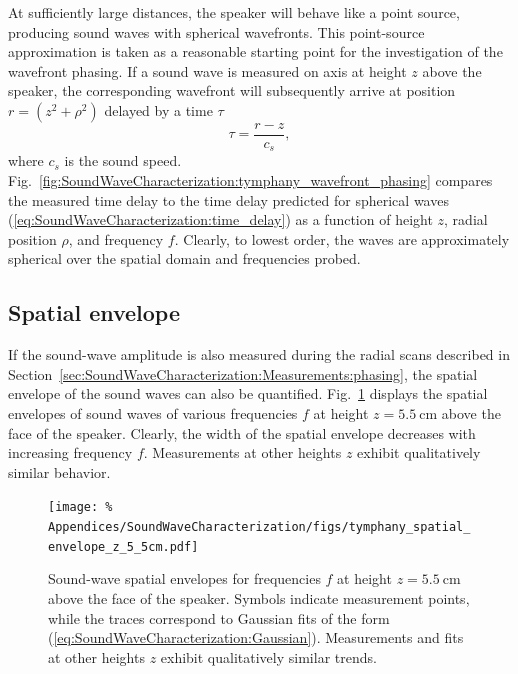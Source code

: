 At sufficiently large distances,
the speaker will behave like a point source,
producing sound waves with spherical wavefronts.
This point-source approximation is taken as a reasonable
starting point for the investigation of the wavefront phasing.
If a sound wave is measured on axis at height $z$ above the speaker,
the corresponding wavefront will subsequently arrive
at position $r = (z^2 + \rho^2)$
delayed by a time $\tau$
\begin{equation}
  \tau = \frac{r - z}{c_s},
  \label{eq:SoundWaveCharacterization:time_delay}
\end{equation}
\graffito{\textcolor{red}{value for $c_s$}}
where $c_s$ is the sound speed.
Fig.~\ref{fig:SoundWaveCharacterization:tymphany_wavefront_phasing}
compares the measured time delay to
the time delay predicted for spherical waves
(\ref{eq:SoundWaveCharacterization:time_delay})
as a function of height $z$, radial position $\rho$, and frequency $f$.
Clearly, to lowest order, the waves are approximately spherical
over the spatial domain and frequencies probed.


\subsection{Spatial envelope}
\label{sec:SoundWaveCharacterization:Measurements:envelope}
If the sound-wave amplitude is also measured
during the radial scans described in
Section~\ref{sec:SoundWaveCharacterization:Measurements:phasing},
the spatial envelope of the sound waves can also be quantified.
Fig.~\ref{fig:SoundWaveCharacterization:tymphany_spatial_envelope_z_5_5cm}
displays the spatial envelopes of sound waves of various frequencies $f$
at height $z = \SI{5.5}{\centi\meter}$ above the face of the speaker.
Clearly, the width of the spatial envelope decreases
with increasing frequency $f$.
Measurements at other heights $z$
exhibit qualitatively similar behavior.

\begin{figure}
  \centering
  \texttt{[image: \%
    Appendices/SoundWaveCharacterization/figs/tymphany\_spatial\_envelope\_z\_5\_5cm.pdf]}
  \caption[Representative spatial envelopes of sound waves]{%
    Sound-wave spatial envelopes for frequencies $f$
    at height $z = \SI{5.5}{\centi\meter}$ above the face of the speaker.
    Symbols indicate measurement points, while
    the traces correspond to Gaussian fits of the form
    (\ref{eq:SoundWaveCharacterization:Gaussian}).
    Measurements and fits at other heights $z$
    exhibit qualitatively similar trends.
  }
\label{fig:SoundWaveCharacterization:tymphany_spatial_envelope_z_5_5cm}
\end{figure}

